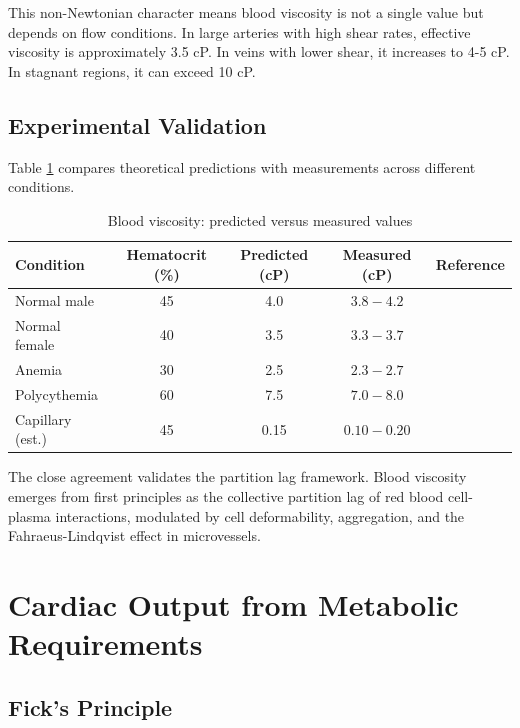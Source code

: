 \documentclass[12pt,a4paper]{article}
\theoremstyle{remark}
\begin{document}
This non-Newtonian character means blood viscosity is not a single value but depends on flow conditions. In large arteries with high shear rates, effective viscosity is approximately 3.5 cP. In veins with lower shear, it increases to 4-5 cP. In stagnant regions, it can exceed 10 cP.

\subsection{Experimental Validation}

Table \ref{tab:viscosity_validation} compares theoretical predictions with measurements across different conditions.

\begin{table}[h]
\centering
\caption{Blood viscosity: predicted versus measured values}
\label{tab:viscosity_validation}
\begin{tabular}{lcccc}
\toprule
\textbf{Condition} & \textbf{Hematocrit (\%)} & \textbf{Predicted (cP)} & \textbf{Measured (cP)} & \textbf{Reference} \\
\midrule
Normal male & 45 & 4.0 & $3.8-4.2$ & \cite{chien1970blood} \\
Normal female & 40 & 3.5 & $3.3-3.7$ & \cite{chien1970blood} \\
Anemia & 30 & 2.5 & $2.3-2.7$ & \cite{wells1962viscosity} \\
Polycythemia & 60 & 7.5 & $7.0-8.0$ & \cite{wells1962viscosity} \\
Capillary (est.) & 45 & 0.15 & $0.10-0.20$ & \cite{pries1994resistance} \\
\bottomrule
\end{tabular}
\end{table}

The close agreement validates the partition lag framework. Blood viscosity emerges from first principles as the collective partition lag of red blood cell-plasma interactions, modulated by cell deformability, aggregation, and the Fahraeus-Lindqvist effect in microvessels.

\section{Cardiac Output from Metabolic Requirements}
\label{sec:cardiac}

\subsection{Fick's Principle}
\end{document}
